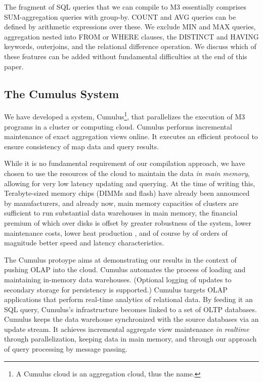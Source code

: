 The fragment of SQL queries that we can compile to M3 essentially comprises
SUM-agg\-regation queries with group-by.
COUNT and AVG queries can be defined by arithmetic expressions over these.
We exclude MIN and MAX queries, aggregation
nested into FROM or WHERE clauses, the DISTINCT and HAVING keywords,
outerjoins,
and the relational difference operation.
We discuss which of these features can be added without fundamental
difficulties at the end of this paper.


\subsection{The Cumulus System}


We have developed a system, Cumulus\footnote{A Cumulus cloud is an
aggregation cloud, thus the name.}, that parallelizes the
execution of M3 programs in a cluster or computing cloud.
Cumulus performs incremental maintenance of exact aggregation views online.
It executes an efficient
protocol to ensure consistency of map data and query results.

While it is no fundamental requirement of our compilation
approach, we have chosen to use the resources of the cloud to maintain
the data {\em in main memory}\/,
allowing for very low latency updating and querying.
At the time of writing this,
Terabyte-sized memory chips (DIMMs and flash) have already been announced by
manufacturers, and already now, main memory capacities of clusters
are sufficient to run substantial data warehouses in
main memory, the financial premium of which over disks is
offset by greater robustness of the system, lower maintenance
costs, lower heat production \cite{1154557}, and of course by of orders
of magnitude better speed and latency characteristics.

The Cumulus protoype aims at demonstrating our results in the context of
pushing OLAP into the cloud.
Cumulus automates  the process of loading
and  maintaining  in-memory  data  warehouses.
(Optional logging of updates to secondary storage
for persistency is supported.)
Cumulus targets OLAP applications  that perform real-time analytics of
relational data.  By feeding it an SQL query, Cumulus's infrastructure
becomes linked to  a set of OLTP databases.  Cumulus  keeps the
data warehouse synchronized with the source databases via an
update stream. It achieves incremental aggregate
view maintenance {\em in realtime}
through parallelization, keeping data in main memory, and through
our approach of query processing by message passing.


